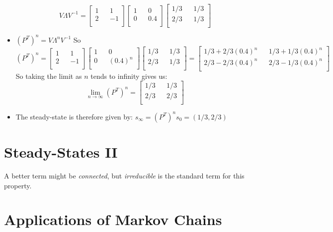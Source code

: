 \begin{example}
\begin{itemize}
$$ V\Lambda V^{-1} = 
\begin{bmatrix} 
1 && 1 \\ 
2 && -1 \\
\end{bmatrix}
\begin{bmatrix} 
1 && 0 \\ 
0 && 0.4 \\
\end{bmatrix}
\begin{bmatrix} 
1/3 && 1/3 \\ 
2/3 && 1/3 \\
\end{bmatrix}
$$
\item $(P^T)^{n} = V \Lambda^n V^{-1}$
So 
$$ (P^T)^{n} = 
\begin{bmatrix} 
1 && 1 \\ 
2 && -1 \\
\end{bmatrix}
\begin{bmatrix} 
1 && 0 \\ 
0 && (0.4)^n \\
\end{bmatrix}
\begin{bmatrix} 
1/3 && 1/3 \\ 
2/3 && 1/3 \\
\end{bmatrix}
=
\begin{bmatrix} 
1/3 + 2/3(0.4)^n && 1/3 + 1/3(0.4)^n \\ 
2/3 - 2/3(0.4)^n && 2/3 - 1/3(0.4)^n\\
\end{bmatrix}
$$
So taking the limit as $n$ tends to infinity gives us:
$$ \lim_{n \rightarrow \infty} (P^T)^{n} = 
\begin{bmatrix} 
1/3 && 1/3 \\ 
2/3 && 2/3 \\
\end{bmatrix}
$$
\item 
The steady-state is therefore given by:
$s_{\infty} = (P^T)^{n} s_0 = (1/3,2/3)$
\end{itemize}

\end{example}

\frmrule



\section{Steady-States II}


A better term might be \textit{connected}, but \textit{irreducible} 
is the standard term for this property. 



\section{Applications of Markov Chains}


